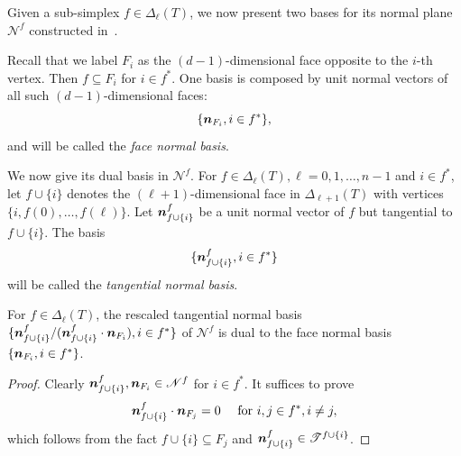 Given a sub-simplex $f\in \Delta_{\ell}(T)$, we now present two bases for its normal plane $\mathscr N^f$ constructed in~\cite{ChenChenHuangWei2023}. 

Recall that we label $F_i$ as the $(d-1)$-dimensional face opposite to the $i$-th vertex. Then $f\subseteq F_i$ for $i\in f^*$. One basis is composed by unit normal vectors of all such $(d-1)$-dimensional faces:
\begin{equation*}%
\{\bs n_{F_i}, i\in f^*\},
\end{equation*}
and will be called the {\it face normal basis}. 

We now give its dual basis in $\mathscr N^f$. 
For $f\in \Delta_{\ell}(T), \ell = 0,1,\ldots, n-1$ and $i\in f^*$, let $f\cup\{i\}$ denotes the $(\ell+1)$-dimensional face in $\Delta_{\ell+1}(T)$ with vertices $\{i, f(0),\dots, f(\ell)\}$. Let $\boldsymbol n_{f\cup\{i\}}^f$ be a unit normal vector of $f$ but tangential to $f\cup\{i\}$. The basis
\begin{equation*}%
\{\bs n_{f\cup\{i\}}^f, i\in f^*\}
\end{equation*}
will be called the {\it tangential normal basis}. 

\begin{lemma}\label{lem:normaldual}
For $f\in \Delta_{\ell}(T)$, the rescaled tangential normal basis $\{\boldsymbol n_{f\cup\{i\}}^f/(\boldsymbol n_{f\cup\{i\}}^f\cdot\boldsymbol n_{F_i}), i\in f^*\}$ of $\mathscr N^f$ is dual to the face normal basis $\{\boldsymbol n_{F_i}, i\in f^*\}$.
\end{lemma}
\begin{proof}
Clearly $\boldsymbol n_{f\cup\{i\}}^f, \boldsymbol n_{F_i}\in \mathscr N^f$ for $i\in f^*$. It suffices to prove
\begin{equation*}
 \boldsymbol n_{f\cup\{i\}}^f\cdot\boldsymbol n_{F_j}=0 \quad \textrm{ for } i,j\in f^*, i\neq j,
\end{equation*}
which follows from the fact $f\cup\{i\}\subseteq F_j$ and $\boldsymbol n_{f\cup\{i\}}^f\in\mathscr T^{f\cup\{i\}}$.
\end{proof}



